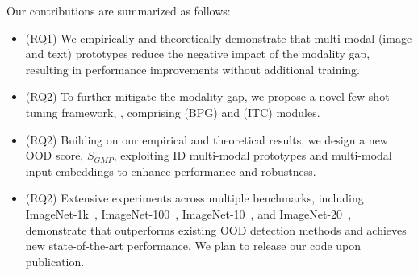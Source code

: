Our contributions are summarized as follows:
\begin{itemize}
    \item 
        (RQ1) 
        We empirically and theoretically demonstrate that multi-modal (image and text) prototypes reduce the negative impact of the modality gap, resulting in performance improvements without additional training.
        

    \item 
        (RQ2) To further mitigate the modality gap, we propose a novel few-shot tuning framework, \ours, comprising \BPG (BPG) and \ITC (ITC) modules.
        
    \item 
        (RQ2) Building on our empirical and theoretical results, we design a new OOD score, $S_{\textit{GMP}}$, exploiting ID multi-modal prototypes and multi-modal input embeddings to enhance performance and robustness. 
        
    \item
        (RQ2) %
        Extensive experiments across multiple benchmarks, including ImageNet-1k~\cite{dengImageNetLargescaleHierarchical2009}, ImageNet-100~\cite{dengImageNetLargescaleHierarchical2009}, ImageNet-10~\cite{dengImageNetLargescaleHierarchical2009}, and ImageNet-20~\cite{dengImageNetLargescaleHierarchical2009}, demonstrate that \ours outperforms existing OOD detection methods and achieves new state-of-the-art performance. 
        We plan to release our code upon publication.
\end{itemize}
